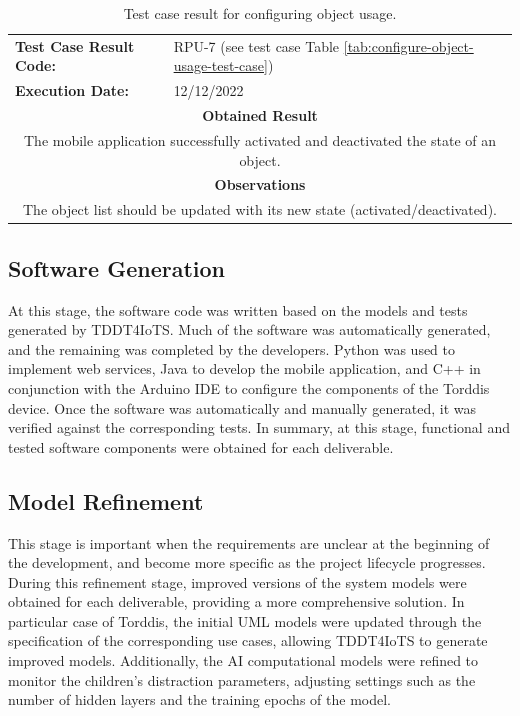 \documentclass[a4paper,fleqn]{cas-sc}
\begin{document}
			\begin{table}[hbt!]
				\centering
				\caption{Test case result for configuring object usage.}
				\label{tab:configure-object-usage-result}
				\begin{tabularx}{\textwidth}{l X}
					\toprule
					\textbf{Test Case Result Code:} & RPU-7 (see test case Table \ref{tab:configure-object-usage-test-case}) \\
					\textbf{Execution Date:} & 12/12/2022 \\
					\midrule
					\multicolumn{2}{c}{\textbf{Obtained Result}} \\
					\midrule
					\multicolumn{2}{c}{The mobile application successfully activated and deactivated the state of an object.} \\
					\midrule
					\multicolumn{2}{c}{\textbf{Observations}} \\
					\midrule
					\multicolumn{2}{c}{The object list should be updated with its new state (activated/deactivated).} \\
					\bottomrule
				\end{tabularx}
			\end{table}
			
		\subsection{Software Generation}
			At this stage, the software code was written based on the models and tests generated by TDDT4IoTS. Much of the software was automatically generated, and the remaining was completed by the developers. Python was used to implement web services, Java to develop the mobile application, and C++ in conjunction with the Arduino IDE to configure the components of the Torddis device. Once the software was automatically and manually generated, it was verified against the  corresponding tests. In summary, at this stage, functional and tested software components were obtained for each deliverable.
			
		\subsection{Model Refinement}
			This stage is important when the requirements are unclear at the beginning of the development, and become more specific as the project lifecycle progresses. During this refinement stage, improved versions of the system models were obtained for each deliverable, providing a more comprehensive solution. In particular case of Torddis, the initial UML models were updated through the specification of the corresponding use cases, allowing TDDT4IoTS to generate improved models. Additionally, the AI computational models were refined to monitor the children's distraction parameters, adjusting settings such as the number of hidden layers and the training epochs of the model.
\end{document}
